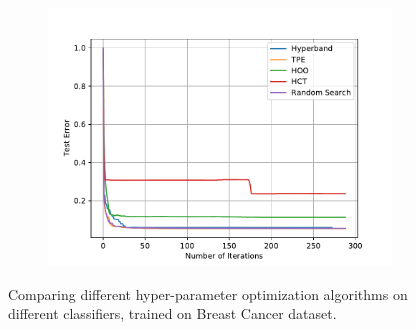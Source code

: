 \documentclass[twoside,11pt]{article}
\begin{document}
\begin{figure}
\begin{subfigure}[t]{0.3\textwidth}
    \centering\includegraphics[width=\textwidth]{img/uci/svm_1.pdf}
    \caption{\SVM}
  \end{subfigure}
  \caption{Comparing different hyper-parameter optimization algorithms on different classifiers, trained on Breast Cancer dataset.}
  \label{fig:breast_cancer}
\end{figure}

\newpage
\vskip 0.2in



\end{document}
